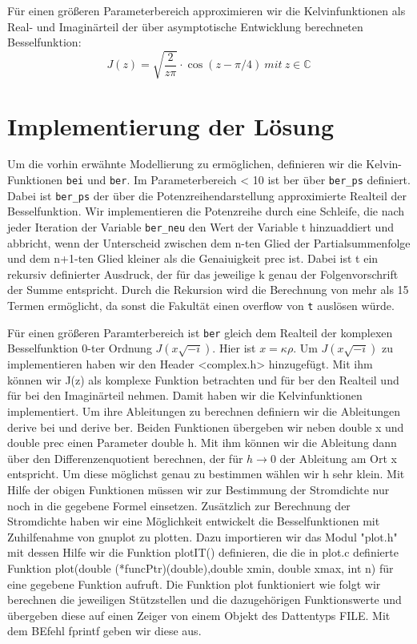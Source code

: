 \documentclass[ngerman]{scrartcl}
\begin{document}
Für einen größeren Parameterbereich approximieren wir die Kelvinfunktionen als Real- und Imaginärteil der über asymptotische Entwicklung berechneten Besselfunktion:
\begin{equation*}
J(z) = \sqrt{\frac{2}{z\pi}} \cdot \cos(z-\pi/4)\ mit\ z \in \mathbb{C}
\end{equation*}

\section*{Implementierung der Lösung}

Um die vorhin erwähnte Modellierung zu ermöglichen, definieren wir die Kelvin-Funktionen \verb!bei! und \verb!ber!.
Im Parameterbereich < 10 ist ber über \verb!ber_ps! definiert.
Dabei ist \verb!ber_ps! der über die Potenzreihendarstellung approximierte Realteil der Besselfunktion.
Wir implementieren die Potenzreihe durch eine Schleife, die nach jeder Iteration der Variable \verb!ber_neu! den Wert der Variable t hinzuaddiert und abbricht,
wenn der Unterscheid zwischen dem n-ten Glied der Partialsummenfolge und dem n+1-ten Glied kleiner als die Genaiuigkeit prec ist. Dabei ist t ein rekursiv definierter Ausdruck, der für das jeweilige k genau der Folgenvorschrift der Summe entspricht.
Durch die Rekursion wird die Berechnung von mehr als 15 Termen ermöglicht, da sonst die Fakultät einen overflow von \verb!t! auslösen würde.

Für einen größeren Paramterbereich ist \verb!ber! gleich dem Realteil der komplexen Besselfunktion 0-ter Ordnung $J(x\sqrt{-i})$.
Hier ist $ x = \kappa \rho $. Um $J(x\sqrt{-i})$ zu implementieren haben wir den Header <complex.h> hinzugefügt. Mit ihm können wir J(z) als komplexe Funktion betrachten und für ber den Realteil und für bei den Imaginärteil nehmen. Damit haben wir die Kelvinfunktionen implementiert. Um ihre Ableitungen zu berechnen definiern wir die Ableitungen derive bei und derive ber. Beiden Funktionen übergeben wir neben double x und double prec einen Parameter double h. Mit ihm können wir die Ableitung dann über den Differenzenquotient berechnen, der für $h \to 0$ der Ableitung am Ort x entspricht. Um diese möglichst genau zu bestimmen wählen wir h sehr klein. Mit Hilfe der obigen Funktionen müssen wir zur Bestimmung der Stromdichte nur noch in die gegebene Formel einsetzen. Zusätzlich zur Berechnung der Stromdichte haben wir eine Möglichkeit entwickelt die Besselfunktionen mit Zuhilfenahme von gnuplot zu plotten. Dazu importieren wir das Modul "plot.h" mit dessen Hilfe wir die Funktion plotIT() definieren, die die in plot.c definierte Funktion plot(double (*funcPtr)(double),double xmin, double xmax, int n) für eine gegebene Funktion aufruft. Die Funktion plot funktioniert wie folgt wir berechnen die jeweiligen Stützstellen und die dazugehörigen Funktionswerte und übergeben diese auf einen Zeiger von einem Objekt des Dattentyps FILE. Mit dem BEfehl fprintf geben wir diese aus.
\end{document}
